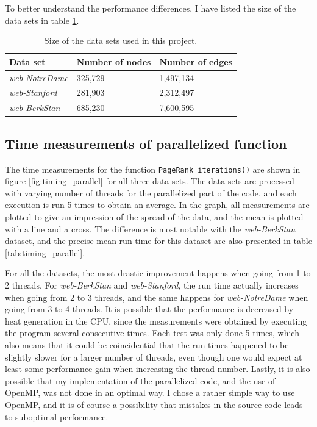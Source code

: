 \documentclass[10pt, a4paper]{amsart}
\numberwithin{figure}{section}
\numberwithin{table}{section}
\begin{document}
To better understand the performance differences, I have listed the size of the data sets in table \ref{tab:datasets}.

\begin{table}
    \caption{Size of the data sets used in this project.}
    \label{tab:datasets}
    \begin{tabular}{lll}
        Data set & Number of nodes & Number of edges \\
        \hline
        \textit{web-NotreDame} & 325,729 & 1,497,134 \\
        \textit{web-Stanford} & 281,903 & 2,312,497\\
        \textit{web-BerkStan} & 685,230 & 7,600,595\\
    \end{tabular}
\end{table}

\subsection{Time measurements of parallelized function}
The time measurements for the function \texttt{PageRank\_iterations()} are shown in figure \ref{fig:timing_parallel} for all three data sets. The data sets are processed with varying number of threads for the parallelized part of the code, and each execution is run 5 times to obtain an average. In the graph, all measurements are plotted to give an impression of the spread of the data, and the mean is plotted with a line and a cross. The difference is most notable with the \textit{web-BerkStan} dataset, and the precise mean run time for this dataset are also presented in table \ref{tab:timing_parallel}.

For all the datasets, the most drastic improvement happens when going from 1 to 2 threads. For \textit{web-BerkStan} and \textit{web-Stanford}, the run time actually increases when going from 2 to 3 threads, and the same happens for \textit{web-NotreDame} when going from 3 to 4 threads. It is possible that the performance is decreased by heat generation in the CPU, since the measurements were obtained by executing the program several consecutive times. Each test was only done 5 times, which also means that it could be coincidential that the run times happened to be slightly slower for a larger number of threads, even though one would expect at least some performance gain when increasing the thread number. Lastly, it is also possible that my implementation of the parallelized code, and the use of OpenMP, was not done in an optimal way. I chose a rather simple way to use OpenMP, and it is of course a possibility that mistakes in the source code leads to suboptimal performance.
\end{document}
